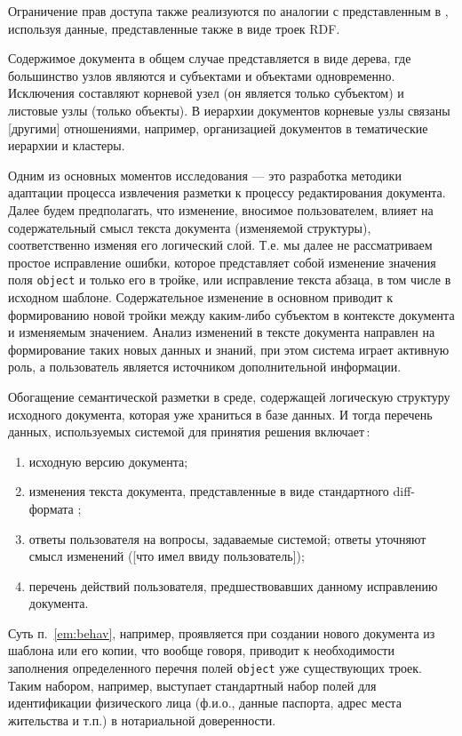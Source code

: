 \documentclass[utf8]{../IncArticle}
\newcommand{\e}[2][fcolor]{\textcolor{pcolor}{[}\textcolor{#1}{#2}\textcolor{pcolor}{]}}
\begin{document}
Ограничение прав доступа также реализуются по аналогии с
представленным в \cite{b2:6,b2:7}, используя данные, представленные
также в виде троек RDF.

Содержимое документа в общем случае представляется в виде дерева, где
большинство узлов являются и субъектами и объектами
одновременно. Исключения составляют корневой узел (он является только
субъектом) и листовые узлы (только объекты).  В иерархии документов
корневые узлы связаны \e{другими} отношениями, например, организацией
документов в тематические иерархии и кластеры.

Одним из основных моментов исследования --- это разработка методики
адаптации процесса извлечения разметки к процессу редактирования
документа.  Далее будем предполагать, что изменение, вносимое
пользователем, влияет на содержательный смысл текста документа
(изменяемой структуры), соответственно изменяя его логический слой.
Т.е. мы далее не рассматриваем простое исправление ошибки, которое
представляет собой изменение значения поля \texttt{object} и только
его в тройке, или исправление текста абзаца, в том числе в исходном
шаблоне.  Содержательное изменение в основном приводит к формированию
новой тройки между каким-либо субъектом в контексте документа и
изменяемым значением.  Анализ изменений в тексте документа направлен
на формирование таких новых данных и знаний, при этом система играет
активную роль, а пользователь является источником дополнительной
информации.

Обогащение семантической разметки в среде, содержащей логическую
структуру исходного документа, которая уже храниться в базе данных.  И
тогда перечень данных, используемых системой для принятия решения
включает\,:
\begin{enumerate}
\item исходную версию документа;
\item изменения текста документа, представленные в виде стандартного
  diff-формата \cite{b9};
\item ответы пользователя на вопросы, задаваемые системой; ответы
  уточняют смысл изменений (\e{что имел ввиду пользователь});
\item перечень действий пользователя, предшествовавших данному
  исправлению документа. \label{em:behav}
\end{enumerate}
Суть п.~\ref{em:behav}, например, проявляется при создании нового
документа из шаблона или его копии, что вообще говоря, приводит к
необходимости заполнения определенного перечня полей \texttt{object}
уже существующих троек.  Таким набором, например, выступает
стандартный набор полей для идентификации физического лица (ф.и.о.,
данные паспорта, адрес места жительства и т.п.) в нотариальной
доверенности.
\end{document}

